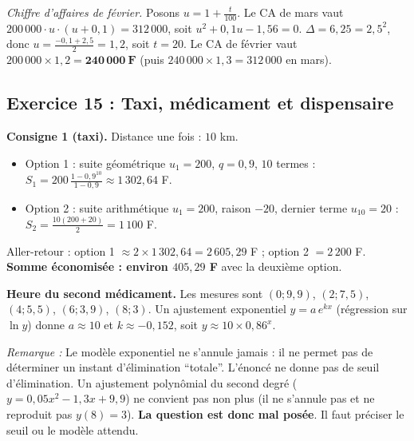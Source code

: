 \documentclass[11pt,a4paper]{article}
\newenvironment{rem}{\par\medskip\noindent\textit{Remarque :}\quad}{\par\medskip}
\begin{document}
\emph{Chiffre d'affaires de f\'evrier.} Posons $u=1+\frac{t}{100}$. Le CA de mars vaut $200\,000\cdot u\cdot(u+0{,}1)=312\,000$, soit
$u^2+0{,}1u-1{,}56=0$. $\Delta=6{,}25=2{,}5^2$, donc $u=\frac{-0{,}1+2{,}5}{2}=1{,}2$, soit $t=20$.
Le CA de f\'evrier vaut $200\,000\times1{,}2=\mathbf{240\,000\ F}$ (puis $240\,000\times1{,}3=312\,000$ en mars).

\subsection{Exercice 15 : Taxi, m\'edicament et dispensaire}

\textbf{Consigne 1 (taxi).} Distance une fois : $10$ km.
\begin{itemize}
  \item Option 1 : suite g\'eom\'etrique $u_1=200$, $q=0{,}9$, $10$ termes :
  $\displaystyle S_1=200\,\frac{1-0{,}9^{10}}{1-0{,}9}\approx1\,302{,}64$ F.
  \item Option 2 : suite arithm\'etique $u_1=200$, raison $-20$, dernier terme $u_{10}=20$ :
  $\displaystyle S_2=\frac{10(200+20)}{2}=1\,100$ F.
\end{itemize}
Aller-retour : option 1 $\approx2\times1\,302{,}64=2\,605{,}29$ F ; option 2 $=2\,200$ F.
\textbf{Somme \'economis\'ee : environ $405{,}29$ F} avec la deuxi\`eme option.

\medskip\noindent\textbf{Heure du second m\'edicament.} Les mesures sont $(0;9{,}9)$, $(2;7{,}5)$, $(4;5{,}5)$, $(6;3{,}9)$, $(8;3)$.
Un ajustement exponentiel $y=a\,e^{kx}$ (r\'egression sur $\ln y$) donne $a\approx10$ et $k\approx-0{,}152$, soit $y\approx10\times0{,}86^x$.
\begin{rem} Le mod\`ele exponentiel ne s'annule jamais : il ne permet pas de d\'eterminer un instant d'\'elimination ``totale''.
L'\'enonc\'e ne donne pas de seuil d'\'elimination. Un ajustement polyn\^omial du second degr\'e
($y=0{,}05x^2-1{,}3x+9{,}9$) ne convient pas non plus (il ne s'annule pas et ne reproduit pas $y(8)=3$).
\textbf{La question est donc mal pos\'ee}. Il faut pr\'eciser le seuil ou le mod\`ele attendu.
\end{rem}
\end{document}
